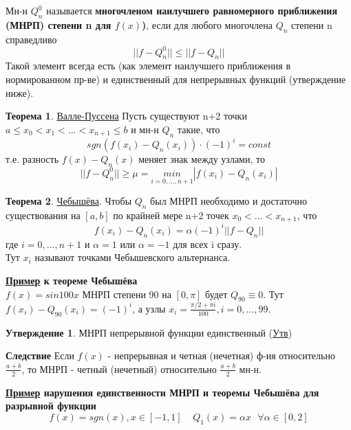\documentclass[specialist, subf, href, colorlinks=true, 12pt, times, mtpro, final]{disser}
\theoremstyle{definition}
\newtheorem{state}{Утверждение}[section]
\newtheorem{theorem}{Теорема}[section]
\begin{document}
    Мн-н $Q_n^0$ называется \textbf{многочленом наилучшего равномерного приближения (МНРП) степени n для $f(x)$)}, если для любого многочлена $Q_n$ степени n справедливо $$||f-Q_n^0|| \le ||f-Q_n||$$ Такой элемент всегда есть (как элемент наилучшего приближения в нормированном пр-ве) и единственный для непрерывных функций (утверждение ниже).
    
    \begin{theorem}
        \hyperlink {lects.35}{Валле-Пуссена} Пусть существуют n+2 точки $a \le x_0 < x_1 < ... < x_{n+1} \le b$ и мн-н $Q_n$ такие, что 
        $$
            sgn(f(x_i) - Q_n(x_i)) \cdot (-1)^i = const
        $$
        т.е. разность $f(x) - Q_n(x)$ меняет знак между узлами, то
        $$
            ||f-Q_n^0|| \ge \mu = \underset{i = 0, ..., n+1}{min} |f(x_i) - Q_n(x_i)|
        $$
    \end{theorem}
    \begin{theorem}
        \hyperlink {lects.35}{Чебышёва}. Чтобы $Q_n$ был МНРП необходимо и достаточно существования на $[a,b]$ по крайней мере n+2 точек $x_0 < ... < x_{n+1}$, что
        $$
            f(x_i) - Q_n(x_i) = \alpha (-1)^i ||f-Q_n||
        $$
        где $i = 0, ..., n+1$ и $\alpha = 1$ или $\alpha = -1$ для всех i сразу.\\
        Тут $x_i$ называют точками Чебышевского альтернанса.
    \end{theorem}

    \noindent\textbf{\hyperlink {lects.36}{Пример} к теореме Чебышёва}\\
    $f(x) = sin100x$ МНРП степени 90 на $[0,\pi]$ будет $Q_{90} \equiv 0$. Тут $f(x_i) - Q_{90}(x_i) = (-1)^i$, а узлы $x_i = \frac{\pi/2 +\pi i}{100}, i = 0, ... , 99$.
    
    \begin{state}
        МНРП непрерывной функции единственный (\hyperlink {lects.36}{Утв})
    \end{state}
    \noindent\textbf{Следствие} Если $f(x)$ - непрерывная и четная (нечетная) ф-ия относительно $\frac{a+b}{2}$, то МНРП - четный (нечетный) относительно $\frac{a+b}{2}$ мн-н.
    
    \noindent\textbf{\hyperlink {lects.36}{Пример} нарушения единственности МНРП и теоремы Чебышёва для разрывной функции}
    $$
        f(x) = sgn(x), x\in[-1,1] \ \ \ \ \ Q_1(x) = \alpha x \ \ \ \forall \alpha \in [0,2] 
    $$
    
\end{document}
